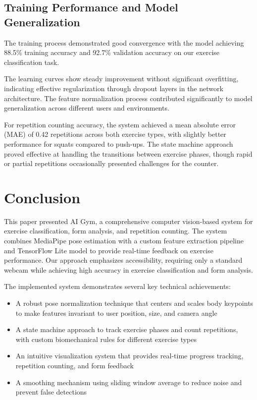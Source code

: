 \documentclass[11pt]{article}
\begin{document}
\subsection{Training Performance and Model Generalization}
The training process demonstrated good convergence with the model achieving 88.5\% training accuracy and 92.7\% validation accuracy on our exercise classification task.

The learning curves show steady improvement without significant overfitting, indicating effective regularization through dropout layers in the network architecture. The feature normalization process contributed significantly to model generalization across different users and environments.

For repetition counting accuracy, the system achieved a mean absolute error (MAE) of 0.42 repetitions across both exercise types, with slightly better performance for squats compared to push-ups. The state machine approach proved effective at handling the transitions between exercise phases, though rapid or partial repetitions occasionally presented challenges for the counter.

\section{Conclusion}
This paper presented AI Gym, a comprehensive computer vision-based system for exercise classification, form analysis, and repetition counting. The system combines MediaPipe pose estimation with a custom feature extraction pipeline and TensorFlow Lite model to provide real-time feedback on exercise performance. Our approach emphasizes accessibility, requiring only a standard webcam while achieving high accuracy in exercise classification and form analysis.

The implemented system demonstrates several key technical achievements:
\begin{itemize}
\item A robust pose normalization technique that centers and scales body keypoints to make features invariant to user position, size, and camera angle
\item A state machine approach to track exercise phases and count repetitions, with custom biomechanical rules for different exercise types
\item An intuitive visualization system that provides real-time progress tracking, repetition counting, and form feedback
\item A smoothing mechanism using sliding window average to reduce noise and prevent false detections
\end{itemize}
\end{document}
